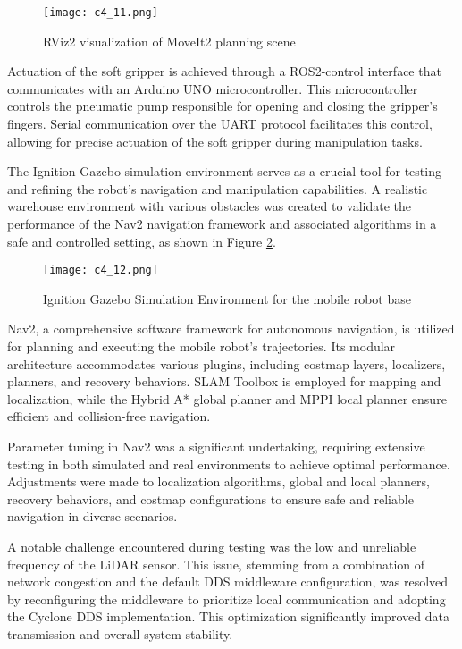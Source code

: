 \begin{figure}[H]
    \centering
    \texttt{[image: c4\_11.png]}
    \caption{RViz2 visualization of MoveIt2 planning scene}
    \label{fig:moveit2}
\end{figure}

Actuation of the soft gripper is achieved through a ROS2-control interface that communicates with an Arduino UNO
microcontroller. This microcontroller controls the pneumatic pump responsible for opening and closing the gripper's fingers.
Serial communication over the UART protocol facilitates this control, allowing for precise actuation of the soft
gripper during manipulation tasks.

The Ignition Gazebo simulation environment serves as a crucial tool for testing and refining the robot's navigation
and manipulation capabilities. A realistic warehouse environment with various obstacles was created to validate 
the performance of the Nav2 navigation framework and associated algorithms in a safe and controlled setting,
as shown in Figure \ref{fig:ignition}.

\begin{figure}[H]
    \centering
    \texttt{[image: c4\_12.png]}
    \caption{Ignition Gazebo Simulation Environment for the mobile robot base}
    \label{fig:ignition}
\end{figure}

Nav2, a comprehensive software framework for autonomous navigation, is utilized for planning and executing the mobile
robot's trajectories. Its modular architecture accommodates various plugins, including costmap layers, localizers,
planners, and recovery behaviors. SLAM Toolbox is employed for mapping and localization, while the Hybrid A* 
global planner and MPPI local planner ensure efficient and collision-free navigation.

Parameter tuning in Nav2 was a significant undertaking, requiring extensive testing in both simulated and real 
environments to achieve optimal performance. Adjustments were made to localization algorithms, global and local
planners, recovery behaviors, and costmap configurations to ensure safe and reliable navigation in diverse 
scenarios.

A notable challenge encountered during testing was the low and unreliable frequency of the LiDAR sensor. 
This issue, stemming from a combination of network congestion and the default DDS middleware configuration, 
was resolved by reconfiguring the middleware to prioritize local communication and adopting the Cyclone DDS 
implementation. This optimization significantly improved data transmission and overall system stability.

